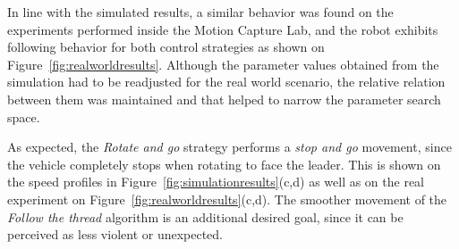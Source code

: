 \documentclass[journal]{IEEEtran}
\begin{document}





In line with the simulated results, a similar behavior was found on the experiments performed inside the Motion Capture Lab, and the robot exhibits following behavior for both control strategies as shown on Figure~\ref{fig:realworldresults}.   Although the parameter values obtained from the simulation had to be readjusted for the real world scenario, the relative relation between them was maintained and that helped to narrow the parameter search space.





As expected, the \textit{Rotate and go} strategy performs a \textit{stop and go} movement, since the vehicle completely stops when rotating to face the leader. This is shown on the speed profiles in Figure~\ref{fig:simulationresults}(c,d) as well as on the real experiment on Figure~\ref{fig:realworldresults}(c,d).    The smoother movement of the \textit{Follow the thread} algorithm is an additional desired goal, since it can be perceived as less violent or unexpected. %
\end{document}
